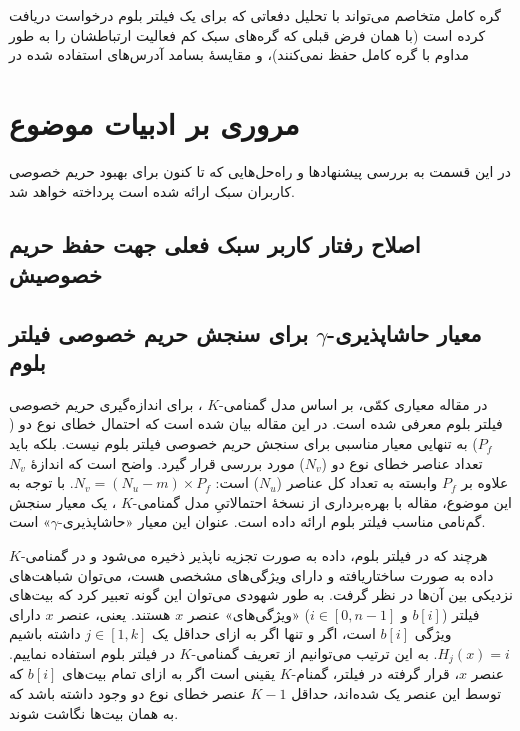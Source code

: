 گره کامل متخاصم می‌تواند با تحلیل دفعاتی که برای یک فیلتر بلوم درخواست دریافت کرده است (با همان فرض قبلی که گره‌های سبک کم فعالیت ارتباطشان را به طور مداوم با گره کامل حفظ نمی‌کنند)، و مقایسهٔ بسامد آدرس‌های استفاده شده در


\section{مروری بر ادبیات موضوع}
\label{LitReview}

در این قسمت به بررسی پیشنهاد‌ها و راه‌حل‌هایی که تا کنون برای بهبود حریم خصوصی کاربران سبک ارائه شده است پرداخته خواهد شد. 


\subsection{
اصلاح رفتار کاربر سبک فعلی جهت حفظ حریم خصوصیش
}
\label{change_behaviour}

\subsection{معیار 
	حاشاپذیری-$\gamma$ برای
	سنجش حریم خصوصی فیلتر بلوم}
\label{gamma-deniability}

در مقاله \cite{Bianchi2012} معیاری کمّی، بر اساس مدل گمنامی-$K$ 
\cite{Sweeney2002}،
برای اندازه‌گیری حریم خصوصی فیلتر بلوم معرفی شده است. در این مقاله بیان شده است که احتمال خطای نوع دو ($P_f$) به تنهایی معیار مناسبی برای سنجش حریم خصوصی فیلتر بلوم نیست. بلکه باید تعداد عناصر خطای نوع دو ($N_v$) مورد بررسی قرار گیرد. واضح است که اندازهٔ $N_v$ علاوه بر $P_f$ وابسته به تعداد کل عناصر ($N_u$) است:
$N_v=(N_u-m)\times P_f$.
با توجه به این موضوع، مقاله \cite{Bianchi2012} با بهره‌برداری از نسخهٔ احتمالاتیِ مدل گمنامی-$K$
\cite{Lodha2008}،
یک معیار سنجش گم‌نامی مناسب فیلتر بلوم ارائه داده است. عنوان این معیار «حاشاپذیری-$\gamma$» است. 

هرچند که در فیلتر بلوم، داده به صورت تجزیه ناپذیر ذخیره می‌شود و در گمنامی-$K$ داده به صورت ساختاریافته و دارای ویژگی‌های مشخصی هست، می‌توان شباهت‌های نزدیکی بین آن‌ها در نظر گرفت. به طور شهودی می‌توان این گونه تعبیر کرد که بیت‌های فیلتر ($b[i]$ و $i\in[0,n-1]$) «ویژگی‌های» عنصر $x$ هستند. یعنی، عنصر $x$ دارای ویژگی $b[i]$ است، اگر و تنها اگر به ازای حداقل یک 
$j\in[1,k]$ داشته باشیم 
$H_j(x)=i$.
به این ترتیب می‌توانیم از تعریف گمنامی-$K$ در فیلتر بلوم استفاده نماییم. عنصر $x$، قرار گرفته در فیلتر، گمنام-$K$ یقینی است اگر به ازای تمام بیت‌های $b[i]$  که توسط این عنصر یک شده‌اند، حداقل $K-1$ عنصر خطای نوع دو وجود داشته باشد که به همان بیت‌ها نگاشت شوند.

